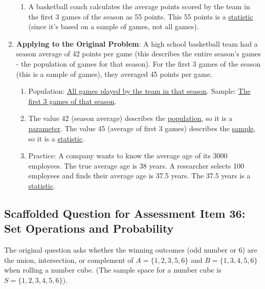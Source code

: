 \documentclass[12pt]{article}
\begin{document}
\begin{enumerate}[label=28.\arabic*]
\begin{enumerate}[label=\alph*)]
        \item A basketball coach calculates the average points scored by the team in the first 3 games of the season as 55 points. This 55 points is a \underline{statistic} (since it's based on a sample of games, not all games).
    \end{enumerate}
    \item \textbf{Applying to the Original Problem}:
    A high school basketball team had a season average of 42 points per game (this describes the entire season's games - the population of games for that season).
    For the first 3 games of the season (this is a sample of games), they averaged 45 points per game.
    \begin{enumerate}[label=\alph*)]
        \item Population: \underline{All games played by the team in that season}.
        Sample: \underline{The first 3 games of that season}.
        \item The value 42 (season average) describes the \underline{population}, so it is a \underline{parameter}.
        The value 45 (average of first 3 games) describes the \underline{sample}, so it is a \underline{statistic}.
        \item Practice: A company wants to know the average age of its 3000 employees. The true average age is 38 years. A researcher selects 100 employees and finds their average age is 37.5 years.
        The 37.5 years is a \underline{statistic}.
    \end{enumerate}
\end{enumerate}

\subsection*{Scaffolded Question for Assessment Item 36: Set Operations and Probability}
The original question asks whether the winning outcomes (odd number or 6) are the union, intersection, or complement of \( A = \{1, 2, 3, 5, 6\} \) and \( B = \{1, 3, 4, 5, 6\} \) when rolling a number cube. (The sample space for a number cube is \(S = \{1, 2, 3, 4, 5, 6\}\)).
\end{document}
